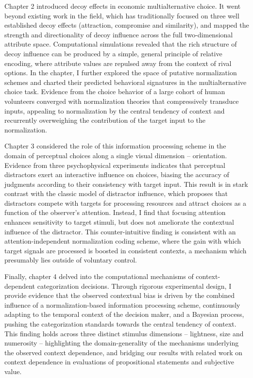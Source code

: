 \documentclass[a4paper, nobind]{templates/ociamthesis}
\begin{document}
Chapter 2 introduced decoy effects in economic multialternative choice. It went beyond existing work in the field, which has traditionally focused on three well established decoy effects (attraction, compromise and similarity), and mapped the strength and directionality of decoy influence across the full two-dimensional attribute space. Computational simulations revealed that the rich structure of decoy influence can be produced by a simple, general principle of relative encoding, where attribute values are repulsed away from the context of rival options. In the chapter, I further explored the space of putative normalization schemes and charted their predicted behavioral signatures in the multialternative choice task. Evidence from the choice behavior of a large cohort of human volunteers converged with normalization theories that compressively transduce inputs, appealing to normalization by the central tendency of context and recurrently overweighing the contribution of the target input to the normalization.

Chapter 3 considered the role of this information processing scheme in the domain of perceptual choices along a single visual dimension -- orientation. Evidence from three psychophysical experiments indicates that perceptual distractors exert an interactive influence on choices, biasing the accuracy of judgments according to their consistency with target input. This result is in stark contrast with the classic model of distractor influence, which proposes that distractors compete with targets for processing resources and attract choices as a function of the observer's attention. Instead, I find that focusing attention enhances sensitivity to target stimuli, but does not ameliorate the contextual influence of the distractor. This counter-intuitive finding is consistent with an attention-independent normalization coding scheme, where the gain with which target signals are processed is boosted in consistent contexts, a mechanism which presumably lies outside of voluntary control.

Finally, chapter 4 delved into the computational mechanisms of context-dependent categorization decisions. Through rigorous experimental design, I provide evidence that the observed contextual bias is driven by the combined influence of a normalization-based information processing scheme, continuously adapting to the temporal context of the decision maker, and a Bayesian process, pushing the categorization standards towards the central tendency of context. This finding holds across three distinct stimulus dimensions -- lightness, size and numerosity -- highlighting the domain-generality of the mechanisms underlying the observed context dependence, and bridging our results with related work on context dependence in evaluations of propositional statements and subjective value.
\end{document}
